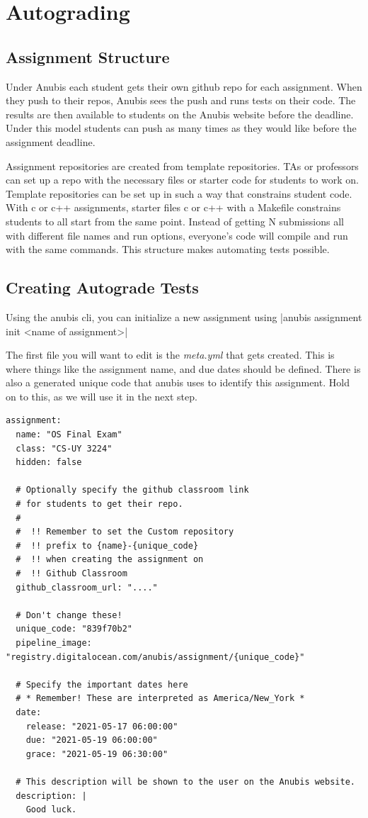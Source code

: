 \chapter{Autograding}\label{ch:assignments}


\section{Assignment Structure}\label{sec:assignment-structure}

Under Anubis each student gets their own github repo for each assignment.
When they push to their repos, Anubis sees the push and runs tests on their code.
The results are then available to students on the Anubis website before the deadline.
Under this model students can push as many times as they would like before the assignment deadline.

Assignment repositories are created from template repositories.
TAs or professors can set up a repo with the necessary files or starter code for students
to work on.
Template repositories can be set up in such a way that constrains student code.
With c or c++ assignments, starter files c or c++ with a Makefile constrains students
to all start from the same point.
Instead of getting N submissions all with different file names and run options,
everyone's code will compile and run with the same commands.
This structure makes automating tests possible.


\section{Creating Autograde Tests}

Using the anubis cli, you can initialize a new assignment using
|anubis assignment init <name of assignment>|

The first file you will want to edit is the \textit{meta.yml} that gets created.
This is where things like the assignment name, and due dates should be defined.
There is also a generated unique code that anubis uses to identify this assignment.
Hold on to this, as we will use it in the next step.

\begin{verbatim}
assignment:
  name: "OS Final Exam"
  class: "CS-UY 3224"
  hidden: false

  # Optionally specify the github classroom link
  # for students to get their repo.
  #
  #  !! Remember to set the Custom repository
  #  !! prefix to {name}-{unique_code}
  #  !! when creating the assignment on
  #  !! Github Classroom
  github_classroom_url: "...."

  # Don't change these!
  unique_code: "839f70b2"
  pipeline_image: "registry.digitalocean.com/anubis/assignment/{unique_code}"

  # Specify the important dates here
  # * Remember! These are interpreted as America/New_York *
  date:
    release: "2021-05-17 06:00:00"
    due: "2021-05-19 06:00:00"
    grace: "2021-05-19 06:30:00"

  # This description will be shown to the user on the Anubis website.
  description: |
    Good luck.
\end{verbatim}

